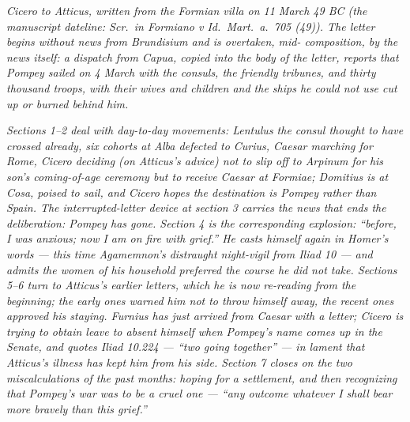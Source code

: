 
\textit{Cicero to Atticus, written from the Formian villa on
11 March 49 BC (the manuscript dateline: \textit{Scr.\ in
Formiano v Id.\ Mart.\ a.\ 705 (49)}). The letter begins
without news from Brundisium and is overtaken, mid-
composition, by the news itself: a dispatch from Capua,
copied into the body of the letter, reports that Pompey
sailed on 4 March with the consuls, the friendly
tribunes, and thirty thousand troops, with their wives
and children and the ships he could not use cut up or
burned behind him.}

\textit{Sections 1--2 deal with day-to-day movements:
Lentulus the consul thought to have crossed already, six
cohorts at Alba defected to Curius, Caesar marching for
Rome, Cicero deciding (on Atticus's advice) not to slip
off to Arpinum for his son's coming-of-age ceremony but
to receive Caesar at Formiae; Domitius is at Cosa,
poised to sail, and Cicero hopes the destination is
Pompey rather than Spain. The interrupted-letter device
at section 3 carries the news that ends the deliberation:
Pompey has gone. Section 4 is the corresponding
explosion: ``before, I was anxious; now I am on fire
with grief.'' He casts himself again in Homer's words
--- this time Agamemnon's distraught night-vigil from
\textit{Iliad} 10 --- and admits the women of his
household preferred the course he did not take. Sections
5--6 turn to Atticus's earlier letters, which he is now
re-reading from the beginning; the early ones warned him
not to throw himself away, the recent ones approved his
staying. Furnius has just arrived from Caesar with a
letter; Cicero is trying to obtain leave to absent
himself when Pompey's name comes up in the Senate, and
quotes \textit{Iliad} 10.224 --- ``two going together''
--- in lament that Atticus's illness has kept him from
his side. Section 7 closes on the two miscalculations of
the past months: hoping for a settlement, and then
recognizing that Pompey's war was to be a cruel one ---
``any outcome whatever I shall bear more bravely than
this grief.''}
